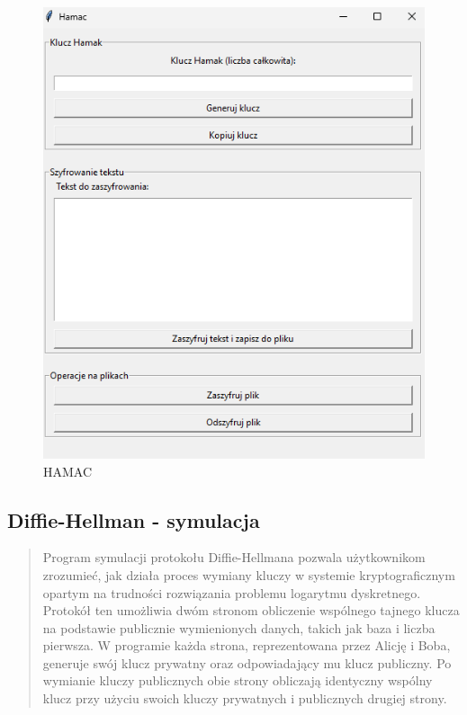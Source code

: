 \documentclass[12pt,a4paper]{article}
\begin{document}
\begin{figure}[!htb]
\begin{center}
\includegraphics[scale=0.45]{pictures/hamac.png}
\caption{HAMAC}
\label{fig:HAMAC}
\end{center}
\end{figure}


\newpage
\subsection{Diffie-Hellman - symulacja}
\begin{quotation} \noindent Program symulacji protokołu Diffie-Hellmana pozwala użytkownikom zrozumieć, jak działa proces wymiany kluczy w systemie kryptograficznym opartym na trudności rozwiązania problemu logarytmu dyskretnego. Protokół ten umożliwia dwóm stronom obliczenie wspólnego tajnego klucza na podstawie publicznie wymienionych danych, takich jak baza i liczba pierwsza. W programie każda strona, reprezentowana przez Alicję i Boba, generuje swój klucz prywatny oraz odpowiadający mu klucz publiczny. Po wymianie kluczy publicznych obie strony obliczają identyczny wspólny klucz przy użyciu swoich kluczy prywatnych i publicznych drugiej strony.\newline
\end{quotation}
\end{document}
